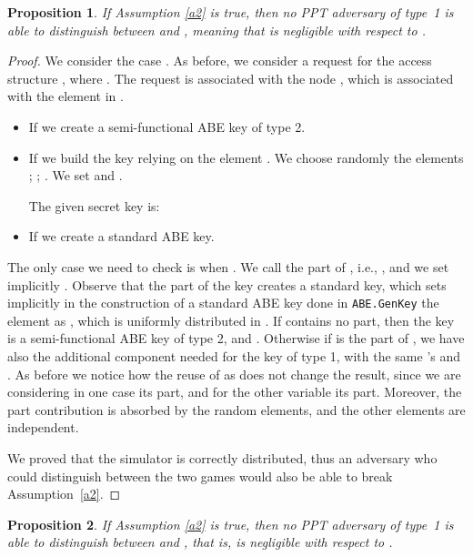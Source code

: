\documentclass[a4paper,10pt]{article}
\newtheorem{proposition}{Proposition}
\newcommand{\algorithm}[2]{\texttt{#1.#2}}
\newcommand{\randomchoose}[1]{We choose randomly the element\ifstrequal{#1}{s}{}{s} }
\newcommand{\game}[2]{}
\newcommand{\typeone}{type~1}
\begin{document}
	\begin{proposition}
		\label{prop.h2}
		If Assumption \ref{a2} is true, then no PPT adversary  of \typeone{} is able to distinguish between \game{H}{k,1} and \game{H}{k,2}, meaning that  is negligible with respect to .
	\end{proposition}
	\begin{proof}
		We consider the case .
		As before, we consider a request for the access structure , where . The request is associated with the node , which is associated with the element  in .
		\begin{itemize}
			\item
			If  we create a semi-functional ABE key of type 2.
			\item
			If  we build the key relying on the element .
			\randomchoose{p}{;
				;
				.
			}
			We set  and .
			
			The given secret key is:
			
			\item
			If  we create a standard ABE key.
		\end{itemize}
		The only case we need to check is when .
		We call  the  part of , i.e., , and we set implicitly .
		Observe that the  part of the key creates a standard key, which sets implicitly in the construction of a standard ABE key done in \algorithm{ABE}{GenKey} the element  as , which is uniformly distributed in .
		If  contains no  part, then the key is a semi-functional ABE key of type 2, and .
		Otherwise if  is the  part of , we have also the additional component needed for the key of type 1, with the same 's and .
		As before we notice how the reuse of  as  does not change the result, since we are considering in one case its  part, and for the other variable its  part.
		Moreover, the  part contribution is absorbed by the random elements, and the other elements are independent.
		
		We proved that the simulator is correctly distributed, thus an adversary who could distinguish between the two games would also be able to break Assumption~\ref{a2}.
	\end{proof}
	\begin{proposition}
		\label{prop.h3}
		If Assumption \ref{a2} is true, then no PPT adversary  of \typeone{} is able to distinguish between \game{H^\prime}{k,1} and \game{H^\prime}{k-1,2}, that is,  is negligible with respect to .
	\end{proposition}
\end{document}

